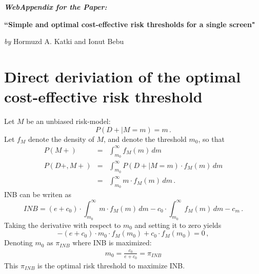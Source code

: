 \documentclass[11pt, letterpaper]{article}
\begin{document}

\begin{center}
\Large\emph{\textbf{WebAppendix for the Paper: }}

\vspace{3mm}
\textbf{``Simple and optimal cost-effective risk thresholds for a single screen"}

\vspace{3mm}
\emph{by} Hormuzd A. Katki and Ionut Bebu
\end{center}


%

\setcounter{section}{0}
\renewcommand*{\theHsection}{chX.\the\value{section}}

\section{Direct deriviation of the optimal cost-effective risk threshold }
\label{sec:derivethreshold}

Let $M$ be an unbiased risk-model: 
\begin{equation*}\label{risk_model}
P(D+|M=m) = m  \,.
\end{equation*}
Let $f_M$ denote the density of $M$, and denote the  threshold $m_0$, so that
\begin{eqnarray*} \nonumber
P(M+) &=& \int_{m_0}^\infty f_M(m)\,dm\\  \label{expressions}
P(D+,M+) &=& \int_{m_0}^\infty P(D+|M=m)\cdot f_M(m)\,dm\\   \nonumber
&=& \int_{m_0}^\infty m\cdot f_M(m)\,dm\,.
\end{eqnarray*}
INB can be writen as 
\begin{equation*}\label{INB2}
INB=(e+c_0)\cdot \int_{m_0}^\infty m\cdot f_M(m)\,dm - c_0\cdot \int_{m_0}^\infty f_M(m)\,dm - c_m\,.
\end{equation*}
Taking the derivative with respect to $m_0$ and setting it to zero yields
\[-(e+c_0)\cdot m_0\cdot f_M(m_0) + c_0\cdot f_M(m_0) =0\,, \]
Denoting $m_0$ as $\pi_{INB}$ where INB is maximized:
\begin{eqnarray*}
m_0 = \frac{c_0}{e+c_0} = \pi_{INB} 
\end{eqnarray*}
This $\pi_{INB}$ is the optimal risk threshold to maximize INB.  
\end{document}
